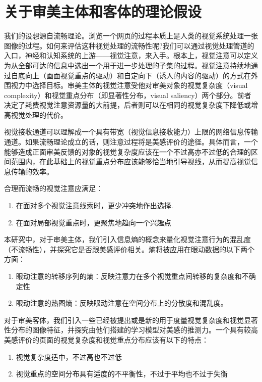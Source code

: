 \chapter{关于审美主体和客体的理论假设}
\label{chap:hypothesis}
我们的设想源自流畅理论。浏览一个网页的过程本质上是人类的视觉系统处理一张图像的过程。如何来评估这种视觉处理的流畅性呢?我们可以通过视觉处理管道的入口，神经和认知系统的上游——视觉注意，来入手。根本上，视觉注意可以定义为从全部可达的信息中选出一个用于进一步处理的子集的过程。视觉注意持续地通过自底向上（画面视觉重点的驱动）和自定向下（诱人的内容的驱动）的方式在外围视力中选择目标。审美主体的视觉注意受他对审美对象的视觉复杂度（visual complexity）和视觉重点分布（即显著性分布，visual saliency）两个部分。前者决定了耗费视觉注意资源量的大前提，后者则可以在相同的视觉复杂度下降低或增高视觉处理的代价。

视觉接收通道可以理解成一个具有带宽（视觉信息接收能力）上限的网络信息传输通道。如果流畅理论成立的话，则注意过程将是美感评价的途径。具体而言，一个能够造成正面审美反馈的对象的视觉复杂度应该在一个不过高亦不过低的合理的区间范围内，在此基础上的视觉重点分布应该能够恰当地引导视线，从而提高视觉信息传输的效率。

合理而流畅的视觉注意应满足：
\begin{enumerate}
  \item 在面对多个视觉注意线索时，更少冲突地作出选择.
  \item 在面对局部视觉重点时，更聚焦地趋向一个兴趣点
\end{enumerate}

本研究中，对于审美主体，我们引入信息熵的概念来量化视觉注意行为的混乱度（不流畅性），并探究它是否跟美感评价相关。熵将被应用在眼动数据的以下两个方面：

\begin{enumerate}
  \item 眼动注意的转移序列的熵：反映注意力在多个视觉重点间转移的复杂度和不确定性
  \item 眼动注意的热图熵：反映眼动注意在空间分布上的分散度和混乱度。
\end{enumerate}

对于审美客体，我们引入一些已经被提出或是新的用于度量视觉复杂度和视觉显著性分布的图像特征，并探究由他们搭建的学习模型对美感的推测力。一个具有较高美感评价的页面的视觉复杂度和视觉重点分布应该有以下的特点：

\begin{enumerate}
  \item 视觉复杂度适中，不过高也不过低
  \item 视觉重点的空间分布具有适度的不平衡性，不过于平均也不过于失衡
\end{enumerate}
